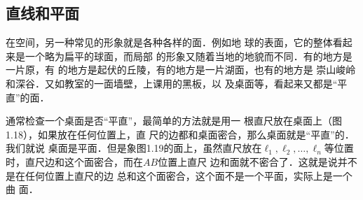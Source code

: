 \subsection{直线和平面}
在空间，另一种常见的形象就是各种各样的面．例如地
球的表面，它的整体看起来是一个略为扁平的球面，而局部
的形象又随着当地的地貌而不同．有的地方是一片原，有
的地方是起伏的丘陵，有的地方是一片湖面，也有的地方是
崇山峻岭和深谷．又如教室的一面墙壁，上课用的黑板，以
及桌面等，看起来又都是“平直”的面．

通常检查一个桌面是否“平直”，最简单的方法就是用一
根直尺放在桌面上（图1.18），如果放在任何位置上，直
尺的边都和桌面密合，那么桌面就是“平直”的．我们就说
桌面是平面．但是象图1.19的面上，虽然直尺放在$\ell_1,\ell_2,\ldots,\ell_n$等位置时，直尺边和这个面密合，而在$AB$位置上直尺
边和面就不密合了．这就是说并不是在任何位置上直尺的边
总和这个面密合，这个面不是一个平面，实际上是一个曲
面．
